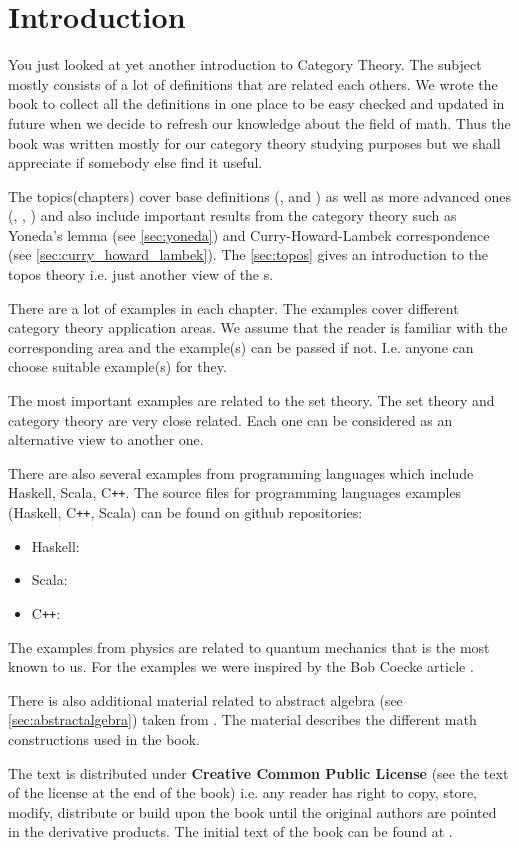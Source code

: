 \chapter*{Introduction}

You just looked at yet another introduction to Category Theory. The
subject mostly consists of a lot of definitions that are related each
others. We wrote the book to collect all the definitions in one
place to be easy checked and updated in future when we decide to refresh
our knowledge about the field of math. Thus the book was written mostly
for our category theory studying purposes but we shall appreciate if
somebody else find it useful. 

The topics(chapters) cover base definitions
(,  and
) as well as more advanced ones (,
, ) and also include important
results from the category theory such as Yoneda's lemma (see
\cref{sec:yoneda}) and Curry-Howard-Lambek correspondence (see
\cref{sec:curry_howard_lambek}). The \cref{sec:topos} gives an
introduction to the topos theory i.e. just another view of the
s.

There are a lot of examples in each chapter. The examples cover
different category 
theory application areas. We assume that the reader is familiar with
the corresponding area and the example(s) can be passed if not. I.e.
anyone can choose suitable example(s) for they.

The most important examples are related to the set theory. The set
theory and category theory are very close related. Each one can be
considered as an alternative view to another one.

There are also several examples from programming languages which include
Haskell, Scala, C\texttt{++}. The source files for programming languages 
examples (Haskell, C\texttt{++}, Scala) can be found on github repositories:
\begin{itemize}
\item Haskell: \cite{github:cattheory_hs_examples}
\item Scala: \cite{github:cattheory_scala_examples}
\item C\texttt{++}: \cite{github:cattheory_cpp_examples}
\end{itemize}

The examples from physics are related to quantum mechanics that is the
most known to us. For the examples we were inspired by the Bob Coecke
article \cite{bib:arxiv:Bob_Coecke_2008}.

There is also additional material related to abstract algebra (see
\cref{sec:abstractalgebra}) taken from
\cite{github:galois_ivanmurashko}. The material describes the
different math constructions used in the book.

The text is distributed under \textbf{Creative Common Public License}
(see the text of the license at the end of the book)
i.e. any reader has right to copy, store, modify, distribute or build
upon the book until the original authors are pointed in the derivative
products. The initial text of the book can be found at
\cite{github:cattheory_ivanmurashko}.  

